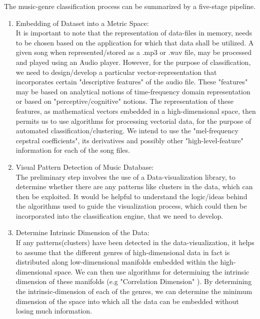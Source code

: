 \documentclass[12pt]{article}
\begin{document}
The music-genre classification process can be summarized by a five-stage pipeline. 
\begin{enumerate}
\item Embedding of Dataset into a Metric Space:\\
It is important to note that the representation of data-files in memory, needs to be chosen based on the application for which that data shall be utilized. A given song when represented/stored as a .mp3 or .wav file, may be processed and played using an Audio player. However, for the purpose of classification, we need to design/develop a particular vector-representation that incorporates certain "descriptive features" of the audio file. These "features" may be based on analytical notions of time-frequency domain representation or based on "perceptive/cognitive" notions. The representation of these features, as mathematical vectors embedded in a high-dimensional space, then permits us to use algorithms for processing vectorial data, for the purpose of automated classification/clustering. We intend to use the "mel-frequency cepstral coefficients", its derivatives and possibly other "high-level-feature" information for each of the song files. 

\item Visual Pattern Detection of Music Database: \\
The preliminary step involves the use of a Data-visualization library, to determine whether there are any patterns like clusters in the data, which can then be exploited. It would be helpful to understand the logic/ideas behind the algorithms used to guide the visualization process, which could then be incorporated into the classification engine, that we need to develop. 

\item Determine Intrinsic Dimension of the Data:\\
If any patterns(clusters) have been detected in the data-visualization, it helps to assume that the different genres of high-dimensional data in fact is distributed along low-dimensional manifolds embedded within the high-dimensional space. We can then use algorithms for determining the intrinsic dimension of these manifolds (e.g "Correlation Dimension" ). By determining the intrinsic-dimension of each of the genres, we can determine the minimum dimension of the space into which all the data can be embedded without losing much information. 


\end{enumerate}
\end{document}
